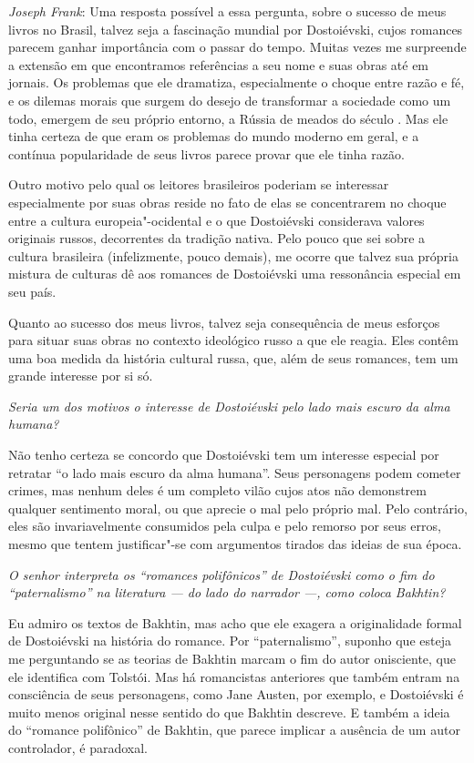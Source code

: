 \noindent
\emph{Joseph Frank}: Uma resposta possível a essa pergunta, sobre o
sucesso de meus livros no Brasil, talvez seja a fascinação mundial por
Dostoiévski, cujos romances parecem ganhar importância com o passar do
tempo. Muitas vezes me surpreende a extensão em que encontramos
referências a seu nome e suas obras até em jornais. Os problemas que ele
dramatiza, especialmente o choque entre razão e fé, e os dilemas morais
que surgem do desejo de transformar a sociedade como um todo,
emergem de seu próprio entorno, a Rússia de meados do século . Mas ele
tinha certeza de que eram os problemas do mundo moderno em geral, e a
contínua popularidade de seus livros parece provar que ele tinha razão.

Outro motivo pelo qual os leitores brasileiros poderiam se interessar
especialmente por suas obras reside no fato de elas se concentrarem no choque entre
a cultura europeia"-ocidental e o que Dostoiévski considerava valores
originais russos, decorrentes da tradição nativa. Pelo pouco que sei
sobre a cultura brasileira (infelizmente, pouco demais), me
ocorre que talvez sua própria mistura de culturas dê aos romances de
Dostoiévski uma ressonância especial em seu país.

Quanto ao sucesso dos meus livros, talvez seja consequência de meus
esforços para situar suas obras no contexto ideológico russo a que ele
reagia. Eles contêm uma boa medida da história cultural russa, que, além
de seus romances, tem um grande interesse por si só.

\medskip

\emph{Seria um dos motivos o interesse de Dostoiévski pelo lado mais
escuro da alma humana?}

Não tenho certeza se concordo que Dostoiévski tem um interesse
especial por retratar ``o lado mais escuro da alma humana''. Seus
personagens podem cometer crimes, mas nenhum deles é um completo vilão
cujos atos não demonstrem qualquer sentimento moral, ou que aprecie o
mal pelo próprio mal. Pelo contrário, eles são invariavelmente
consumidos pela culpa e pelo remorso por seus erros, mesmo que
tentem justificar"-se com argumentos tirados das ideias de sua época.

\medskip

\emph{O senhor interpreta os ``romances polifônicos'' de Dostoiévski como
o fim do ``paternalismo'' na literatura --- do lado do narrador ---,
como coloca Bakhtin?}

Eu admiro os textos de Bakhtin, mas acho que ele exagera a originalidade
formal de Dostoiévski na história do romance. Por ``paternalismo'',
suponho que esteja me perguntando se as teorias de Bakhtin marcam o fim
do autor onisciente, que ele identifica com Tolstói. Mas há romancistas
anteriores que também entram na consciência de seus personagens, como
Jane Austen, por exemplo, e Dostoiévski é muito menos original nesse
sentido do que Bakhtin descreve. E também a ideia do ``romance polifônico''
de Bakhtin, que parece implicar a ausência de um autor controlador, é
paradoxal.

